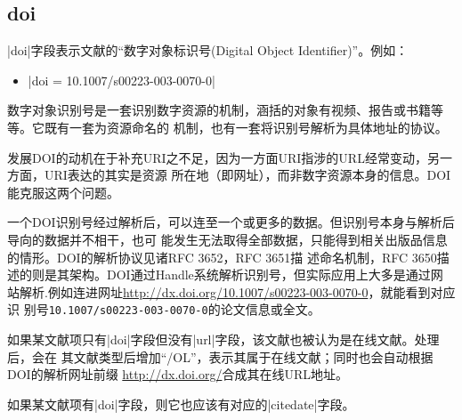 
\subsection{doi}\label{subsec:bibfield-doi}

|doi|字段表示文献的``数字对象标识号(Digital Object Identifier)''。例如：
\begin{itemize}
\item |doi = {10.1007/s00223-003-0070-0}|
\end{itemize}

数字对象识别号是一套识别数字资源的机制，涵括的对象有视频、报告或书籍等等。它既有一套为资源命名的
机制，也有一套将识别号解析为具体地址的协议。

发展DOI的动机在于补充URI之不足，因为一方面URI指涉的URL经常变动，另一方面，URI表达的其实是资源
所在地（即网址），而非数字资源本身的信息。DOI能克服这两个问题。

一个DOI识别号经过解析后，可以连至一个或更多的数据。但识别号本身与解析后导向的数据并不相干，也可
能发生无法取得全部数据，只能得到相关出版品信息的情形。DOI的解析协议见诸RFC 3652，RFC 3651描
述命名机制，RFC 3650描述的则是其架构。DOI通过Handle系统解析识别号，但实际应用上大多是通过网
站解析.例如连进网址\url{http://dx.doi.org/10.1007/s00223-003-0070-0}，就能看到对应识
别号\texttt{10.1007/s00223-003-0070-0}的论文信息或全文。

如果某文献项只有|doi|字段但没有|url|字段，该文献也被认为是在线文献。{\BibTeX}处理后，会在
其文献类型后增加``/OL''，表示其属于在线文献；同时也会自动根据DOI的解析网址前缀
\url{http://dx.doi.org/}合成其在线URL地址。

如果某文献项有|doi|字段，则它也应该有对应的|citedate|字段。

